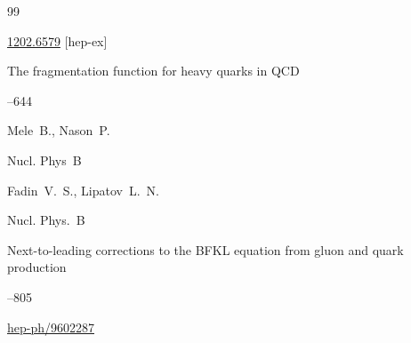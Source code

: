 \begin{thebibliography}{99}



\arxiv \href{http://arxiv.org/abs/1202.6579}{1202.6579} [hep-ex]




\paper The fragmentation function for heavy quarks in QCD




--644

\by Mele~B., Nason~P.


\jour Nucl. Phys~B 




\by Fadin~V.~S., Lipatov~L.~N.

\jour Nucl. Phys.~B 


\paper Next-to-leading corrections to the BFKL equation from gluon and quark production


--805



\arxiv \href{http://arxiv.org/abs/hep-ph/9602287}{hep-ph/9602287}



\end{thebibliography}





\EngDate



\newpage

\Russian



%

% 